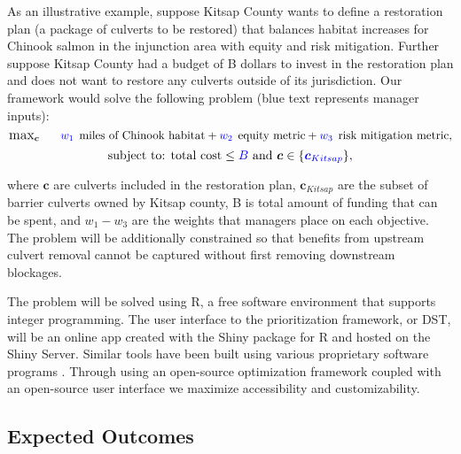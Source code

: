 \documentclass[12pt]{elsarticle}
\begin{document}
	As an illustrative example, suppose Kitsap County wants to define a restoration plan (a package of culverts to be restored) that balances habitat increases for Chinook salmon in the injunction area with equity and risk mitigation. Further suppose Kitsap County had a budget of B dollars to invest in the restoration plan and does not want to restore any culverts outside of its jurisdiction. Our framework would solve the following problem (blue text represents manager inputs):
	\begin{equation*}
		\substack{\text{\large max}}_{\boldsymbol{c}}\hspace{0.25in} \textcolor{blue}{w_1}\:\: \text{miles of Chinook habitat} + \textcolor{blue}{w_2}\:\: \text{equity metric} + \textcolor{blue}{w_3}\:\: \text{risk mitigation metric},
	\end{equation*}
	\begin{equation*}
		\text{subject to:  total cost} \le \textcolor{blue}{B} \text{ and } \boldsymbol{c} \in \{\textcolor{blue}{\boldsymbol{c}_{Kitsap}}  \},
	\end{equation*}
	
	
	where $\boldsymbol{c}$ are culverts included in the restoration plan, $\boldsymbol{c}_{Kitsap}$ are the subset of barrier culverts owned by Kitsap county, B is total amount of funding that can be spent, and $w_1-w_3$ are the weights that managers place on each objective. The problem will be additionally constrained so that benefits from upstream culvert removal cannot be captured without first removing downstream blockages.
	
	The problem will be solved using R, a free software environment that supports integer programming. The user interface to the prioritization framework, or DST, will be an online app created with the Shiny package for R and hosted on the Shiny Server. Similar tools have been built using various proprietary software programs \citep{optipass2015migratory, moody2017pet, mcmanamay2019commonalities}. Through using an open-source optimization framework coupled with an open-source user interface we maximize accessibility and customizability.  
	
	\subsection{Expected Outcomes} %
	
\end{document}
